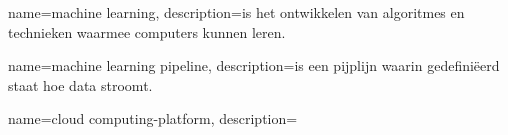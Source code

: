 {
    name=machine learning,
    description={is het ontwikkelen van algoritmes en technieken waarmee computers kunnen leren.}
}

{
    name=machine learning pipeline,
    description={is een pijplijn waarin gedefiniëerd staat hoe data stroomt.}
}

{
    name=cloud computing-platform,
    description={}
}